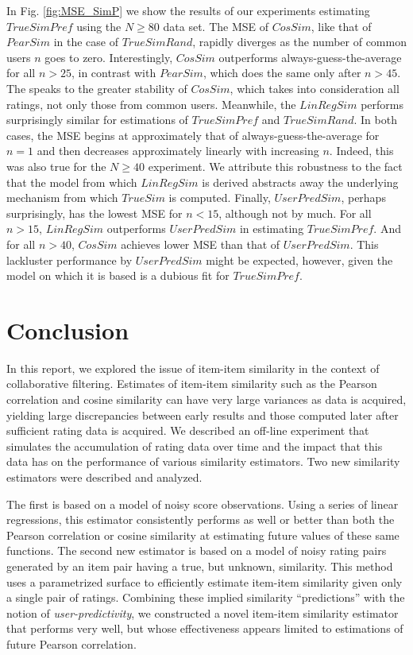 \documentclass[11pt]{article}
\begin{document}
{In Fig. \ref{fig:MSE_SimP} we show the results of our experiments estimating
$TrueSimPref$ using the $N \geq 80$ data set. The MSE of $CosSim$, like that of
$PearSim$ in the case of $TrueSimRand$, rapidly diverges as the number of common
users $n$ goes to zero. Interestingly, $CosSim$ outperforms
always-guess-the-average for all $n > 25$, in contrast with $PearSim$, which
does the same only after $n > 45$. The speaks to the greater stability of
$CosSim$, which takes into consideration all ratings, not only those from common
users. Meanwhile, the $LinRegSim$ performs surprisingly similar for estimations
of $TrueSimPref$ and $TrueSimRand$. In both cases, the MSE begins at
approximately that of always-guess-the-average for $n = 1$ and then decreases
approximately linearly with increasing $n$. Indeed, this was also true for the
$N \geq 40$ experiment. We attribute this robustness to the fact that the model
from which $LinRegSim$ is derived abstracts away the underlying mechanism from
which $TrueSim$ is computed. Finally, $UserPredSim$, perhaps surprisingly, has
the lowest MSE for $n < 15$, although not by much. For all $n > 15$, $LinRegSim$
outperforms $UserPredSim$ in estimating $TrueSimPref$. And for all $n > 40$,
$CosSim$ achieves lower MSE than that of $UserPredSim$. This lackluster
performance by $UserPredSim$ might be expected, however, given the model on
which it is based is a dubious fit for $TrueSimPref$.

\section*{Conclusion}

In this report, we explored the issue of item-item similarity in the context of
collaborative filtering. Estimates of item-item similarity such as the Pearson
correlation and cosine similarity can have very large variances as data is
acquired, yielding large discrepancies between early results and those computed
later after sufficient rating data is acquired. We described an off-line
experiment that simulates the accumulation of rating data over time and the
impact that this data has on the performance of various similarity estimators.
Two new similarity estimators were described and analyzed.

The first is based on a model of noisy score observations. Using a series of
linear regressions, this estimator consistently performs as well or better than
both the Pearson correlation or cosine similarity at estimating future values of
these same functions. The second new estimator is based on a model of noisy
rating pairs generated by an item pair having a true, but unknown, similarity.
This method uses a parametrized surface to efficiently estimate item-item
similarity given only a single pair of ratings. Combining these implied
similarity ``predictions'' with the notion of {\em user-predictivity}, we
constructed a novel item-item similarity estimator that performs very well, but
whose effectiveness appears limited to estimations of future Pearson
correlation.

}
\end{document}
